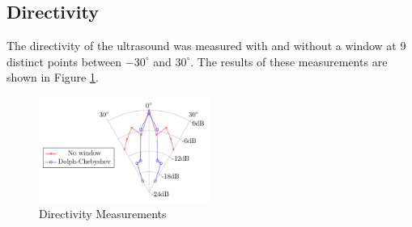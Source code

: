 \subsection{Directivity}
The directivity of the ultrasound was measured with and without a window at 9 distinct points between $-30^\circ$ and $30^\circ$. The results of these measurements are shown in Figure \ref{6.2.1_fig:Directivity_measurements}.
\begin{center}
    \begin{figure}[h!]
        \centering
        \includegraphics[width=0.5\textwidth]{images/6_Measurements/Polar_PlotDirectivity_Measurement.pdf}
        \caption{Directivity Measurements}
        \label{6.2.1_fig:Directivity_measurements}
    \end{figure}
\end{center}

